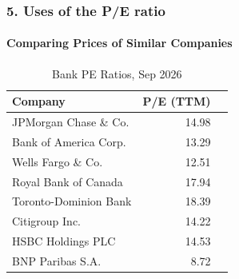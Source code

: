 \documentclass{beamer}
\begin{document}
\begin{frame}[t]
    \frametitle{5. Uses of the P/E ratio}
    \framesubtitle{Comparing Prices of Similar Companies}

    \begin{table}[h]
        \caption{Bank PE Ratios, Sep 2026}
        \label{tab:placeholder_label}
        \centering
        \begin{tabular}{lrr}
            \toprule
            Company & P/E (TTM) \\
            \midrule
            JPMorgan Chase \& Co. & 14.98 \\
            Bank of America Corp.  & 13.29 \\
            Wells Fargo \& Co. & 12.51 \\
            Royal Bank of Canada  & 17.94 \\
            Toronto-Dominion Bank  & 18.39 \\
            Citigroup Inc. & 14.22 \\
            HSBC Holdings PLC  & 14.53 \\
            BNP Paribas S.A.  & 8.72 \\
            \bottomrule
        \end{tabular}
    \end{table}


\end{frame}

\end{document}
